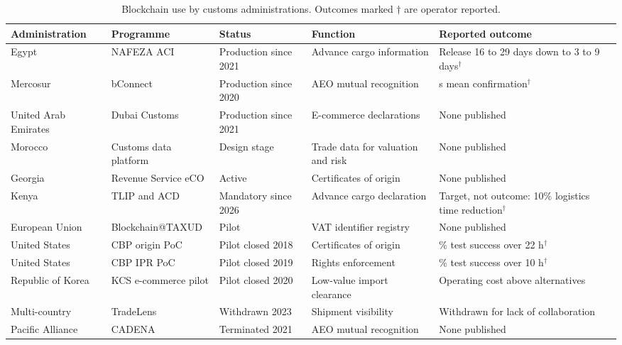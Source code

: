 \documentclass[information,article,submit,moreauthors]{Definitions/mdpi}
\begin{document}
\begin{table}[H]
\caption{Blockchain use by customs administrations. Outcomes marked $\dagger$ are operator reported.\label{tab:deployments}}
\small
\begin{tabularx}{\textwidth}{>{\raggedright\arraybackslash}p{2.0cm}>{\raggedright\arraybackslash}p{2.5cm}>{\raggedright\arraybackslash}p{1.9cm}>{\raggedright\arraybackslash}p{2.4cm}>{\raggedright\arraybackslash}X}
\toprule
\textbf{Administration} & \textbf{Programme} & \textbf{Status} & \textbf{Function} & \textbf{Reported outcome}\\
\midrule
Egypt & NAFEZA ACI & Production since 2021 & Advance cargo information & Release 16 to 29 days down to 3 to 9 days$^\dagger$ \cite{wconews2022egypt}\\
Mercosur & bConnect & Production since 2020 & AEO mutual recognition & 3.5 s mean confirmation$^\dagger$ \cite{wco2022casestudies}\\
United Arab Emirates & Dubai Customs & Production since 2021 & E-commerce declarations & None published \cite{unescap2024digitalizetrade}\\
Morocco & Customs data platform & Design stage & Trade data for valuation and risk & None published \cite{wco2022disruptive}\\
Georgia & Revenue Service eCO & Active & Certificates of origin & None published \cite{wco2022disruptive}\\
Kenya & TLIP and ACD & Mandatory since 2026 & Advance cargo declaration & Target, not outcome: 10\% logistics time reduction$^\dagger$ \cite{kra2026acd,tma2026tlip}\\
European Union & Blockchain@TAXUD & Pilot & VAT identifier registry & None published \cite{wco2022casestudies}\\
United States & CBP origin PoC & Pilot closed 2018 & Certificates of origin & 100\% test success over 22 h$^\dagger$ \cite{cbp2019nafta}\\
United States & CBP IPR PoC & Pilot closed 2019 & Rights enforcement & 100\% test success over 10 h$^\dagger$ \cite{cbp2020ipr}\\
Republic of Korea & KCS e-commerce pilot & Pilot closed 2020 & Low-value import clearance & Operating cost above alternatives \cite{wconews2020korea}\\
Multi-country & TradeLens & Withdrawn 2023 & Shipment visibility & Withdrawn for lack of collaboration \cite{maersk2022tradelens}\\
Pacific Alliance & CADENA & Terminated 2021 & AEO mutual recognition & None published \cite{wconews2018cadena,unescap2024digitalizetrade}\\
\bottomrule
\end{tabularx}
\end{table}
\end{document}
